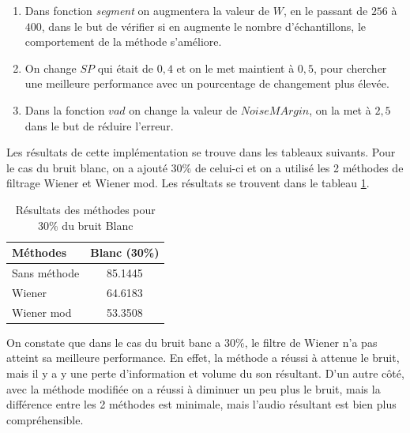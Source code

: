 \documentclass[conference,onecolumn]{IEEEtran}
\begin{document}
\begin{enumerate}
    \item Dans fonction \textit{segment} on augmentera la valeur de $W$, en le passant de $256$ à $400$, dans le but de vérifier si en augmente le nombre d’échantillons, le comportement de la méthode s’améliore.
    \item On change $SP$ qui était de $0,4$ et on le met maintient à $0,5$, pour chercher une meilleure performance avec un pourcentage de changement plus élevée.
    \item Dans la fonction $vad$ on change la valeur de $NoiseMArgin$, on la met à $2,5$ dans le but de réduire l’erreur.   
\end{enumerate}
Les résultats de cette implémentation se trouve dans les tableaux suivants. Pour le cas du bruit blanc, on a ajouté 30\% de celui-ci et on a utilisé les 2 méthodes de filtrage Wiener et Wiener mod. Les résultats se trouvent dans le tableau \ref{table:t13}.

\begin{table}[H]
    \centering
    \begin{tabular}{ l  c }
    \textbf{Méthodes} & \textbf{Blanc (30\%)} \\
    \hline
    Sans méthode &  85.1445\\
    Wiener & 64.6183 \\
    Wiener mod & 53.3508  \\
    \end{tabular}
    \caption{Résultats des méthodes pour 30\% du bruit Blanc}
    \label{table:t13}
\end{table}

On constate que dans le cas du bruit banc a 30\%, le filtre de Wiener n’a pas atteint sa meilleure performance. En effet, la méthode a réussi à attenue le bruit, mais il y a y une perte d’information et volume du son résultant. D’un autre côté, avec la méthode modifiée on a réussi à diminuer un peu plus le bruit, mais la différence entre les 2 méthodes est minimale, mais l’audio résultant est bien plus compréhensible.\medskip
\end{document}
